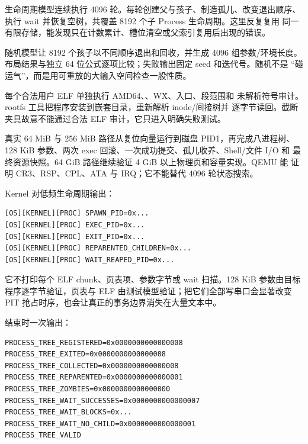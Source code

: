 
生命周期模型连续执行 4096 轮。每轮创建父与孩子、制造孤儿、改变退出顺序、
执行 wait 并恢复空树，共覆盖 8192 个子 Process 生命周期。这里反复复用
同一有限存储，能发现只在计数累计、槽位清空或父索引复用后出现的错误。


随机模型让 8192 个孩子以不同顺序退出和回收，并生成 4096 组参数/环境长度。
布局结果与独立 64 位公式逐项比较；失败输出固定 seed 和迭代号。随机不是
“碰运气”，而是用可重放的大输入空间检查一般性质。


每个合法用户 ELF 单独执行 AMD64、、W\^X、入口、段范围和
未解析符号审计。rootfs 工具把程序安装到嵌套目录，重新解析 inode/间接树并
逐字节读回。截断夹具故意不能通过合法 ELF 审计，它只进入明确失败测试。


真实 64 MiB 与 256 MiB 路径从复位向量运行到磁盘 PID1，再完成八进程树、
128 KiB 参数、两次 exec 回滚、一次成功提交、孤儿收养、Shell/文件 I/O 和
最终资源快照。64 GiB 路径继续验证 4 GiB 以上物理页和容量实现。QEMU 能
证明 CR3、RSP、CPL、ATA 与 IRQ；它不能替代 4096 轮状态搜索。

Kernel 对低频生命周期输出：

\begin{lstlisting}[caption={v1.7 进程生命周期日志}]
[OS][KERNEL][PROC] SPAWN_PID=0x...
[OS][KERNEL][PROC] EXEC_PID=0x...
[OS][KERNEL][PROC] EXIT_PID=0x...
[OS][KERNEL][PROC] REPARENTED_CHILDREN=0x...
[OS][KERNEL][PROC] WAIT_REAPED_PID=0x...
\end{lstlisting}

它不打印每个 ELF chunk、页表项、参数字节或 wait 扫描。128 KiB 参数由目标
程序逐字节验证，页表与 ELF 由测试模型验证；把它们全部写串口会显著改变 PIT
抢占时序，也会让真正的事务边界消失在大量文本中。

结束时一次输出：

\begin{lstlisting}[caption={正常八进程树的精确摘要}]
PROCESS_TREE_REGISTERED=0x0000000000000008
PROCESS_TREE_EXITED=0x0000000000000008
PROCESS_TREE_COLLECTED=0x0000000000000008
PROCESS_TREE_REPARENTED=0x0000000000000001
PROCESS_TREE_ZOMBIES=0x0000000000000000
PROCESS_TREE_WAIT_SUCCESSES=0x0000000000000007
PROCESS_TREE_WAIT_BLOCKS=0x...
PROCESS_TREE_WAIT_NO_CHILD=0x0000000000000001
PROCESS_TREE_VALID
\end{lstlisting}

